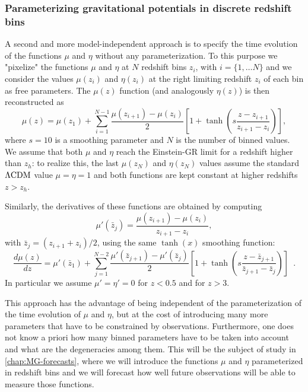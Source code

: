 \subsubsection{Parameterizing gravitational potentials in discrete redshift bins \label{sub:param-z-bins-th}}

A second and more model-independent approach
is to specify the time evolution of the functions $\mu$ and $\eta$ without
any parameterization.
To this purpose we "pixelize" the functions $\mu$ and $\eta$ at $N$ redshift bins $z_i$, with $i=\{1, \ldots N  \}$ 
and we consider the values
$\mu(z_{i})$ and $\eta(z_{i})$ at the right limiting redshift $z_{i}$
of each bin as free parameters.
The $\mu(z)$ function (and analogously $\eta(z)$) is then reconstructed
as 
\begin{equation}\label{eq:MGbin-mu-general-parametrization}
\mu(z)=\mu(z_{1})+\sum_{i=1}^{N-1}{\frac{\mu(z_{i+1})-\mu(z_{i})}{2}\left[1+\tanh{\left(s\frac{z-z_{i+1}}{z_{i+1}-z_{i}}\right)}\right]},
\end{equation}
where $s=10$ is a smoothing parameter and $N$ is the number of binned
values. We assume that both $\mu$ and $\eta$ reach the Einstein-GR limit
for a redshift higher than $z_h$: to realize this, the last $\mu(z_{N})$ and $\eta(z_{N})$
values assume the standard $\Lambda\mathrm{CDM}$ value $\mu=\eta=1$ and both functions
are kept constant at higher redshifts $z> z_h$.


Similarly, the derivatives of these functions are obtained by computing
\begin{equation}
\mu'({\bar{z}_{j}})=\frac{\mu(z_{i+1})-\mu(z_{i})}{z_{i+1}-z_{i}},
\end{equation}
with $\bar{z}_{j}=(z_{i+1}+z_{i})/2$, using the same $\tanh(x)$
smoothing function: 
\begin{equation}\label{eq:MGbin-muderiv-parametrization}
\frac{d\mu(z)}{dz}=\mu'(\bar{z}_{1})+\sum_{j=1}^{N-2}{\frac{\mu'(\bar{z}_{j+1})-\mu'(\bar{z}_{j})}{2}\left[1+\tanh{\left(s\frac{z-\bar{z}_{j+1}}{\bar{z}_{j+1}-\bar{z}_{j}}\right)}\right]}\,\,\,.
\end{equation}
In particular we assume $\mu'=\eta'=0$ for $z<0.5$ and for $z>3$.

This approach has the advantage of being independent of the parameterization of the time evolution of $\mu$ and $\eta$,
but at the cost of introducing
many more parameters that have to be constrained by observations.
Furthermore, one does not know a priori how many binned parameters have to be taken into account
and what are the degeneracies among them.
This will be the subject of study in \cref{chap:MG-forecasts}, where we will
introduce the functions $\mu$ and $\eta$ parameterized in redshift bins and we will forecast
how well future observations will be able to measure those functions.



